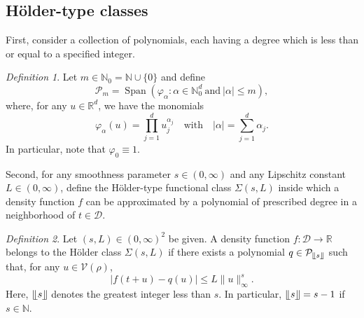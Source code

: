 \documentclass[bj,authoryear]{imsart}
\numberwithin{equation}{section}
\theoremstyle{plain}
\theoremstyle{remark}
\newtheorem{definition}{Definition}
\newcommand{\N}{\mathbb{N}}
\newcommand{\R}{\mathbb{R}}
\newcommand{\1}{\mathds{1}}
\newcommand{\domain}{\mathcal{D}}
\newcommand{\voisin}{\mathcal{V}}
\begin{document}
\subsection{H\"older-type classes}

    First, consider a collection of polynomials, each having a degree which is less than or equal to a specified integer.

    \begin{definition}
        Let $m\in \N_0 = \N\cup\{0\}$ and define
        \begin{equation*}
            \mathcal{P}_{\!m} = \operatorname{Span}\left(\varphi_{\alpha} : \alpha\in \N_0^d ~\text{and}~ |\alpha| \leq m\right),
        \end{equation*}
        where, for any $u\in \R^d$, we have the monomials
        \begin{equation*}
            \varphi_{\alpha}(u) = \prod_{j=1}^d u_j^{\alpha_j}
            \quad \text{with} \quad
            \lvert\alpha\rvert = \sum_{j=1}^d \alpha_j.
        \end{equation*}
        In particular, note that $\varphi_0 \equiv 1$.
    \end{definition}

    Second, for any smoothness parameter $s\in (0,\infty)$ and any Lipschitz constant $L\in (0,\infty)$, define the H\"older-type functional class $\Sigma(s,L)$ inside which a density function $f$ can be approximated by a polynomial of prescribed degree in a neighborhood of $t\in \domain$.

    \begin{definition}\label{def:Sigma.s.L}
        Let $(s,L)\in (0,\infty)^2$ be given.
        A density function $f:\domain\to\R$ belongs to the H\"older class $\Sigma(s,L)$ if there exists a polynomial $q\in \mathcal{P}_{\llfloor s \rrfloor}$ such that, for any $u\in \voisin(\rho)$,
        \begin{equation}\label{eq:approx-holder}
            |f(t+u) - q(u) | \leq L\|u\|_{\infty}^s.
        \end{equation}
        Here, $\llfloor s \rrfloor$ denotes the greatest integer less than $s$. In particular, $\llfloor s \rrfloor=s-1$ if $s\in \N$.
    \end{definition}
\end{document}
